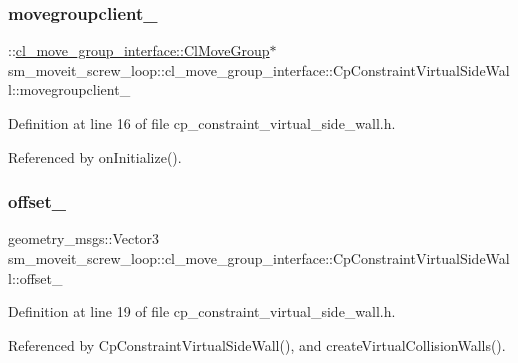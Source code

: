 \subsubsection{\texorpdfstring{movegroupclient\+\_\+}{movegroupclient\_}}
{\footnotesize\ttfamily \+::\hyperlink{classcl__move__group__interface_1_1ClMoveGroup}{cl\+\_\+move\+\_\+group\+\_\+interface\+::\+Cl\+Move\+Group}$\ast$ sm\+\_\+moveit\+\_\+screw\+\_\+loop\+::cl\+\_\+move\+\_\+group\+\_\+interface\+::\+Cp\+Constraint\+Virtual\+Side\+Wall\+::movegroupclient\+\_\+\hspace{0.3cm}{\ttfamily [private]}}



Definition at line 16 of file cp\+\_\+constraint\+\_\+virtual\+\_\+side\+\_\+wall.\+h.



Referenced by on\+Initialize().

\mbox{\label{classsm__moveit__screw__loop_1_1cl__move__group__interface_1_1CpConstraintVirtualSideWall_a3ba336712454339510d0fb6804ff2a16}} 
\subsubsection{\texorpdfstring{offset\+\_\+}{offset\_}}
{\footnotesize\ttfamily geometry\+\_\+msgs\+::\+Vector3 sm\+\_\+moveit\+\_\+screw\+\_\+loop\+::cl\+\_\+move\+\_\+group\+\_\+interface\+::\+Cp\+Constraint\+Virtual\+Side\+Wall\+::offset\+\_\+\hspace{0.3cm}{\ttfamily [private]}}



Definition at line 19 of file cp\+\_\+constraint\+\_\+virtual\+\_\+side\+\_\+wall.\+h.



Referenced by Cp\+Constraint\+Virtual\+Side\+Wall(), and create\+Virtual\+Collision\+Walls().

